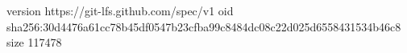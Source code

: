 version https://git-lfs.github.com/spec/v1
oid sha256:30d4476a61cc78b45df0547b23cfba99c8484dc08c22d025d6558431534b46c8
size 117478
